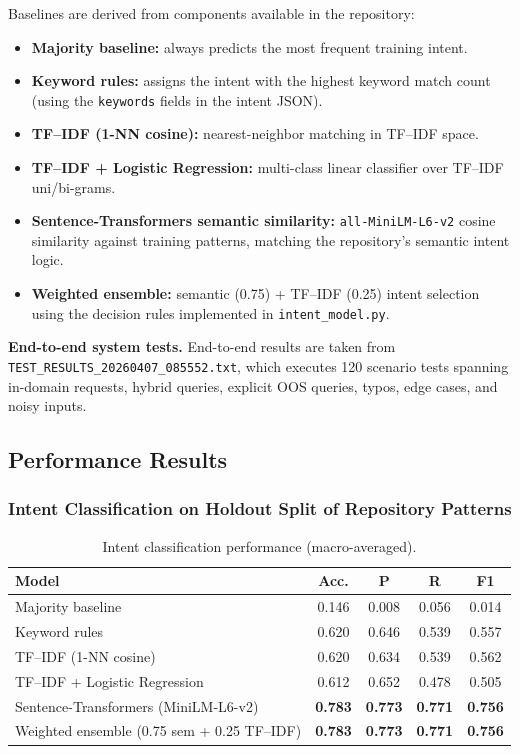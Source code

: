 \documentclass[12pt,onecolumn]{report}
\begin{document}
Baselines are derived from components available in the repository:
\begin{itemize}
	\item \textbf{Majority baseline:} always predicts the most frequent training intent.
	\item \textbf{Keyword rules:} assigns the intent with the highest keyword match count (using the \texttt{keywords} fields in the intent JSON).
	\item \textbf{TF--IDF (1-NN cosine):} nearest-neighbor matching in TF--IDF space.
	\item \textbf{TF--IDF + Logistic Regression:} multi-class linear classifier over TF--IDF uni/bi-grams.
	\item \textbf{Sentence-Transformers semantic similarity:} \texttt{all-MiniLM-L6-v2} cosine similarity against training patterns, matching the repository's semantic intent logic.
	\item \textbf{Weighted ensemble:} semantic (0.75) + TF--IDF (0.25) intent selection using the decision rules implemented in \texttt{intent\_model.py}.
\end{itemize}

\textbf{End-to-end system tests.} End-to-end results are taken from \texttt{TEST\_RESULTS\_20260407\_085552.txt}, which executes 120 scenario tests spanning in-domain requests, hybrid queries, explicit OOS queries, typos, edge cases, and noisy inputs.

\subsection{Performance Results}
\subsubsection{Intent Classification on Holdout Split of Repository Patterns}
\begin{table}[t]
\caption{Intent classification performance (macro-averaged).}
\label{tab:results-intent}
\centering
\small
\setlength{\tabcolsep}{6pt}
\renewcommand{\arraystretch}{1.25}
\begin{tabular}{p{}cccc}
\toprule
\textbf{Model} & \textbf{Acc.} & \textbf{P} & \textbf{R} & \textbf{F1}\\
\midrule
Majority baseline & 0.146 & 0.008 & 0.056 & 0.014\\
Keyword rules & 0.620 & 0.646 & 0.539 & 0.557\\
TF--IDF (1-NN cosine) & 0.620 & 0.634 & 0.539 & 0.562\\
TF--IDF + Logistic Regression & 0.612 & 0.652 & 0.478 & 0.505\\
Sentence-Transformers (MiniLM-L6-v2) & \textbf{0.783} & \textbf{0.773} & \textbf{0.771} & \textbf{0.756}\\
Weighted ensemble (0.75 sem + 0.25 TF--IDF) & \textbf{0.783} & \textbf{0.773} & \textbf{0.771} & \textbf{0.756}\\
\bottomrule
\end{tabular}
\end{table}
\end{document}
